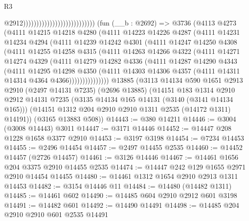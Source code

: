 \begin{lexlean}{R3}
\begin{coremodule}
                                                          @2912)))))))))))))))))))))))))))
    (fun (__b : @2692) =>
    @3736
      (@4113
        @4273
        (@4111
          @14215
          @14218
          @4280
          (@4111
            @14223
            @14226
            @4287
            (@4111
              @14231
              @14234
              @4294
              (@4111
                @14239
                @14242
                @4301
                (@4111
                  @14247
                  @14250
                  @4308
                  (@4111
                    @14255
                    @14258
                    @4315
                    (@4111
                      @14263
                      @14266
                      @4322
                      (@4111
                        @14271
                        @14274
                        @4329
                        (@4111
                          @14279
                          @14282
                          @4336
                          (@4111
                            @14287
                            @14290
                            @4343
                            (@4111
                              @14295
                              @14298
                              @4350
                              (@4111
                                @14303
                                @14306
                                @4357
                                (@4111 @14311 @14314 @4364 @4366)))))))))))))))
    @13885
    (@3113
      @14134
      @590
      @1651
      @2913
      @2910
      (@2497 @14131 @7235)
      (@2696 @13885)
      (@14151
        @183
        @1314
        @2910
        @2912
        @14131
        @7235
        (@3135 @14134 @165 @14131 (@3140 (@3141 @14134 @165)))
        (@14151 @1312 @204 @2910 @2910 @1311 @2535 (@14172 @1311) @14191))
      (@3165 @13883 @508))
@14443 := @380 @14211
@14446 := @3004 (@3008 @14443) @3011
@14447 := @3171 @14446
@14452 := @14447 @208 @1228 @1658 @3377 @2910
@14453 := @3197 @3198
@14454 := @7234 @14453
@14455 := @2496 @14454
@14457 := @2497 @14455 @2535
@14460 := @14452 @14457 (@2726 @14457)
@14461 := @3126 @14446
@14467 := @14461 @1656 @204 @3375 @2910 @14455 @2535
@14474 := @14447 @242 @129 @1655 @2971 @2910 @14454 @14455
@14480 := @14461 @1312 @1654 @2910 @2913 @1311 @14453
@14482 := @3154 @14446 @11
@14484 := @14480 (@14482 @1311)
@14485 := @14461 @602
@14490 := @14485 @604 @2910 @2912 @601 @3198
@14491 := @14482 @601
@14492 := @14490 @14491
@14498 := @14485 @204 @2910 @2910 @601 @2535 @14491

\end{coremodule}
\end{lexlean}

